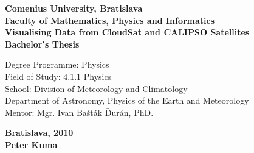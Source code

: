 \begin{titlepage}
\centering\LARGE\bfseries Comenius University, Bratislava\\Faculty of Mathematics, Physics and Informatics\\[6cm]
\centering\huge\mdseries Visualising Data from CloudSat and CALIPSO Satellites\\[0.5cm]
\centering\Large\mdseries Bachelor's Thesis\\[3cm]

\vfill

\raggedright\normalsize\mdseries
\begin{tabbing}
Degree Programme: Physics\\
Field of Study: 4.1.1 Physics\\
School: \= Division of Meteorology and Climatology\\
\>	   Department of Astronomy, Physics of the Earth and Meteorology\\
Mentor: Mgr. Ivan Bašták Ďurán, PhD.\\[2cm]
\end{tabbing}

\raggedright\large\bfseries Bratislava, 2010\\[0.5cm]
\centering\large\bfseries Peter Kuma

\end{titlepage}